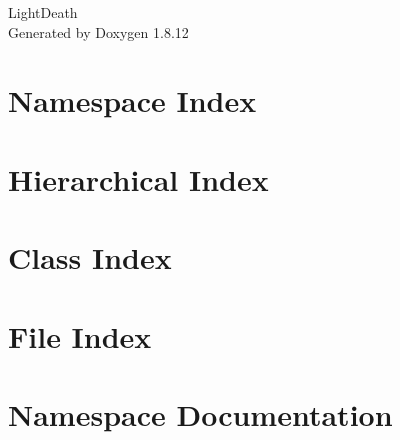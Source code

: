 \documentclass[twoside]{book}
\newcommand{\+}{\discretionary{\mbox{\scriptsize$\hookleftarrow$}}{}{}}
\newcommand{\clearemptydoublepage}{%
  \newpage{\pagestyle{empty}\cleardoublepage}%
}
\begin{document}
\hypersetup{pageanchor=false,
             bookmarksnumbered=true,
             pdfencoding=unicode
            }
\begin{titlepage}
\vspace*{7cm}
\begin{center}%
{\Large Light\+Death }\\
\vspace*{1cm}
{\large Generated by Doxygen 1.8.12}\\
\end{center}
\end{titlepage}
\clearemptydoublepage
{}
\tableofcontents
\clearemptydoublepage
{}
\hypersetup{pageanchor=true}

\chapter{Namespace Index}

\chapter{Hierarchical Index}

\chapter{Class Index}

\chapter{File Index}

\chapter{Namespace Documentation}



\end{document}
